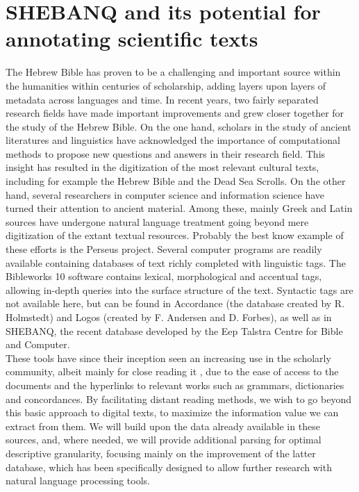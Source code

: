 \documentclass[10pt,a4paper]{article}
\begin{document}
\section{SHEBANQ and its potential for annotating scientific texts}
The Hebrew Bible has proven to be a challenging and important source within the humanities within centuries of scholarship, adding layers upon layers of metadata across languages and time. In recent years, two fairly separated research fields have made important improvements and grew closer together for the study of the Hebrew Bible. On the one hand, scholars in the study of ancient literatures and linguistics have acknowledged the importance of computational methods to propose new questions and answers in their research field. This insight has resulted in the digitization of the most relevant cultural texts, including for example the Hebrew Bible and the Dead Sea Scrolls. On the other hand, several researchers in computer science and information science have turned their attention to ancient material. Among these, mainly Greek and Latin sources have undergone natural language treatment going beyond mere digitization of the extant textual resources. Probably the best know example of these efforts is the Perseus project. Several computer programs are readily available containing databases of text richly completed with linguistic tags. The Bibleworks 10 software contains lexical, morphological and accentual tags, allowing in-depth queries into the surface structure of the text. Syntactic tags are not available here, but can be found in Accordance (the database created by R. Holmstedt) and Logos (created by F. Andersen and D. Forbes), as well as in SHEBANQ, the recent database developed by the Eep Talstra Centre for Bible and Computer. 
\\These tools have since their inception seen an increasing use in the scholarly community, albeit mainly for close reading it \cite{Mor1}, due to the ease of access to the documents and the hyperlinks to relevant works such as grammars, dictionaries and concordances. By facilitating distant reading methods, we wish to go beyond this basic approach to digital texts, to maximize the information value we can extract from them. We will build upon the data already available in these sources, and, where needed, we will provide additional parsing for optimal descriptive granularity, focusing mainly on the improvement of the latter database, which has been specifically designed to allow further research with natural language processing tools. 
\end{document}
